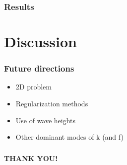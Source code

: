 \documentclass[7pt]{beamer}
\begin{document}

 \begin{frame}
\frametitle{Results}


\end{frame}





\section{Discussion}
\begin{frame}
 \frametitle{Future directions}
 \begin{itemize}
 \item 2D problem
 \item Regularization methods
 \item Use of wave heights
 \item Other dominant modes of k (and f)
 \end{itemize}

\end{frame}
\begin{frame}
\frametitle{}
\hspace{2.5cm}
\begin{minipage}{50mm}   
                                                                                                                           
      \begin{alertblock}{}    
                                          
            \begin{center}
                                                                                                                                                                                  
                  \textbf{THANK YOU!}
                            
                                                                       
            \end{center}
      \end{alertblock}
\end{minipage}
\end{frame}
\end{document}

